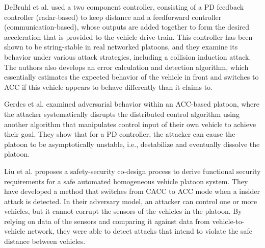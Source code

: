 DeBruhl et al. \cite{DWST15} used a two component controller, consisting of a PD feedback controller (radar-based) to keep distance and a feedforward controller (communication-based), whose outputs are added together to form the desired acceleration that is provided to the vehicle drive-train. This controller has been shown to be string-stable in real networked platoons, and they examine its behavior under various attack strategies, including a collision induction attack. The authors also develops an error calculation and detection algorithm, which essentially estimates the expected behavior of the vehicle in front and switches to ACC if this vehicle appears to behave differently than it claims to.

Gerdes et al. \cite{GWH13} examined adversarial behavior within an ACC-based platoon, where the attacker systematically disrupts the distributed control algorithm using another algorithm that manipulates control input of their own vehicle to achieve their goal. They show that for a PD controller, the attacker can cause the platoon to be asymptotically unstable, i.e., destabilize and eventually dissolve the platoon.

Liu et al. \cite{LMWZ17} proposes a safety-security co-design process to derive functional security requirements for a safe automated homogeneous vehicle platoon system. They have developed a method that switches from CACC to ACC mode when a insider attack is detected. In their adversary model, an attacker can control one or more vehicles, but it cannot corrupt the sensors of the vehicles in the platoon. By relying on data of the sensors and comparing it against data from vehicle-to-vehicle network, they were able to detect attacks that intend to violate the safe distance between vehicles.
 

